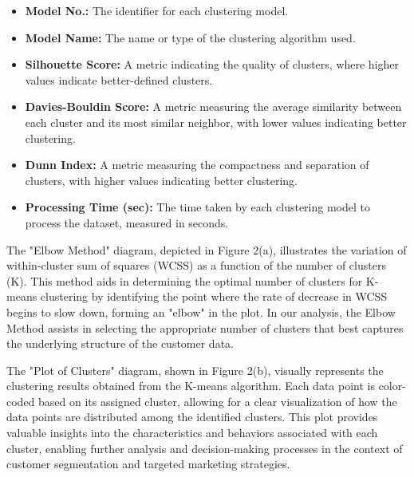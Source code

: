 \documentclass{josis}
\begin{document}
\begin{itemize}
    \item \textbf{Model No.:} The identifier for each clustering model.
    \item \textbf{Model Name:} The name or type of the clustering algorithm used.
    \item \textbf{Silhouette Score:} A metric indicating the quality of clusters, where higher values indicate better-defined clusters.
    \item \textbf{Davies-Bouldin Score:} A metric measuring the average similarity between each cluster and its most similar neighbor, with lower values indicating better clustering.
    \item \textbf{Dunn Index:} A metric measuring the compactness and separation of clusters, with higher values indicating better clustering.
    \item \textbf{Processing Time (sec):} The time taken by each clustering model to process the dataset, measured in seconds.
\end{itemize}


The "Elbow Method" diagram, depicted in Figure 2(a), illustrates the variation of within-cluster sum of squares (WCSS) as a function of the number of clusters (K). This method aids in determining the optimal number of clusters for K-means clustering by identifying the point where the rate of decrease in WCSS begins to slow down, forming an "elbow" in the plot. In our analysis, the Elbow Method assists in selecting the appropriate number of clusters that best captures the underlying structure of the customer data.

The "Plot of Clusters" diagram, shown in Figure 2(b), visually represents the clustering results obtained from the K-means algorithm. Each data point is color-coded based on its assigned cluster, allowing for a clear visualization of how the data points are distributed among the identified clusters. This plot provides valuable insights into the characteristics and behaviors associated with each cluster, enabling further analysis and decision-making processes in the context of customer segmentation and targeted marketing strategies.
\end{document}
